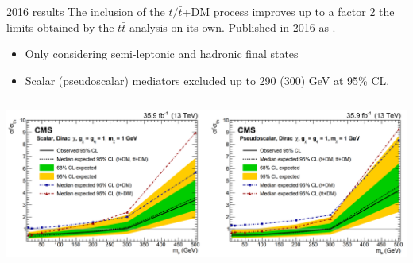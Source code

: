 \documentclass[8pt]{beamer}
\begin{document}
\begin{frame}{2016 results}
\justifying
The inclusion of the $t/ \bar t$+DM process \alert{improves up to a factor 2 } the limits obtained by the $t \bar t$ analysis on its own. Published in 2016 as \href{http://cms.cern.ch/iCMS/analysisadmin/cadilines?line=EXO-18-010&tp=an&id=2085&ancode=EXO-18-010}{}.

\begin{itemize}
\item Only considering semi-leptonic and hadronic final states
\item Scalar (pseudoscalar) mediators \alert{excluded up to 290 (300) GeV} at 95\% CL.
\end{itemize} \vfill

\begin{center}
\begin{columns}
	\begin{column}{1.0\textwidth}
		\begin{center}
			\includegraphics[width=1.0\textwidth]{figs/limitsprevious.png}
    		 \end{center}
	\end{column} \hfill
\end{columns} \vfill

\end{center} \vfill

\end{frame}
\end{document}

